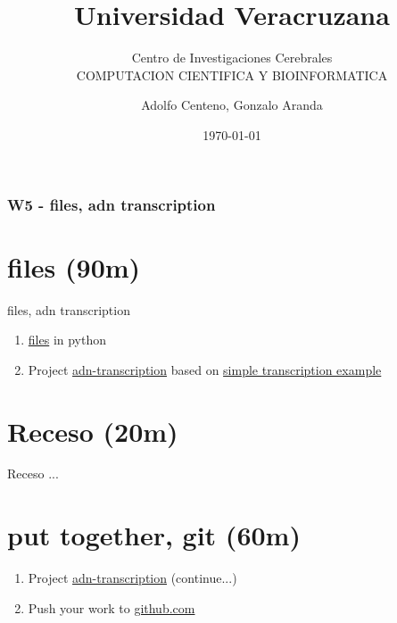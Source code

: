 \documentclass{beamer}
\begin{document}
\title{Universidad Veracruzana}  
\subtitle{Centro de Investigaciones Cerebrales\\COMPUTACION CIENTIFICA Y BIOINFORMATICA}
\author{Adolfo Centeno, Gonzalo Aranda}
\date{\today} 

\begin{frame}
\titlepage
\end{frame}

\begin{frame}\frametitle{W5 - files, adn transcription }
\tableofcontents
\end{frame} 


\section{files (90m) }

\begin{frame}

files, adn transcription

\begin{enumerate}

\item

	\href{https://github.com/adsoftsito/python/blob/master/w5/files.py}{files} in python

\item
	Project \href{https://github.com/adsoftsito/python/blob/master/w5/adntranscription.py}{adn-transcription} based on
	\href{https://www.youtube.com/watch?v=iXNhQoLNtYo&t=382s}{simple transcription example}
	
	
\end{enumerate} 


\end{frame}


\section{Receso  (20m) }

\begin{frame}


Receso ...

\end{frame}


\section{put together,  git (60m) }

\begin{frame}

\begin{enumerate}

\item
	Project \href{https://github.com/adsoftsito/python/blob/master/w5/adntranscription.py}{adn-transcription} (continue...)

\item
	Push your work to \href{https://github.com}{github.com}

\end{enumerate} 


\end{frame}
\end{document}
